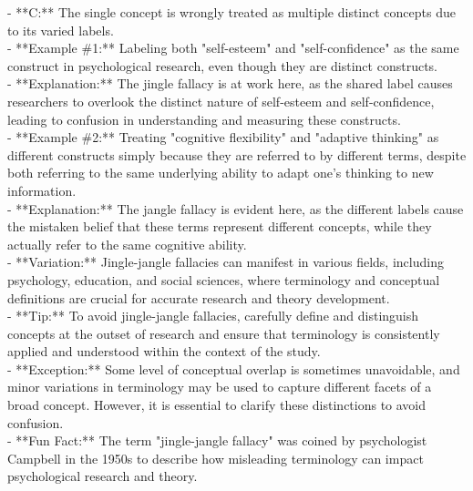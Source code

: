 \documentclass[a4paper,12pt,single,pdftex]{scrbook}
\begin{document}
    
          - **C:** The single concept is wrongly treated as multiple distinct concepts due to its varied labels.
    \\

    
      - **Example \#1:** Labeling both "self-esteem" and "self-confidence" as the same construct in psychological research, even though they are distinct constructs.
    \\

    
      - **Explanation:** The jingle fallacy is at work here, as the shared label causes researchers to overlook the distinct nature of self-esteem and self-confidence, leading to confusion in understanding and measuring these constructs.
    \\

    
      - **Example \#2:** Treating "cognitive flexibility" and "adaptive thinking" as different constructs simply because they are referred to by different terms, despite both referring to the same underlying ability to adapt one's thinking to new information.
    \\

    
      - **Explanation:** The jangle fallacy is evident here, as the different labels cause the mistaken belief that these terms represent different concepts, while they actually refer to the same cognitive ability.
    \\

    
      - **Variation:** Jingle-jangle fallacies can manifest in various fields, including psychology, education, and social sciences, where terminology and conceptual definitions are crucial for accurate research and theory development.
    \\

    
      - **Tip:** To avoid jingle-jangle fallacies, carefully define and distinguish concepts at the outset of research and ensure that terminology is consistently applied and understood within the context of the study.
    \\

    
      - **Exception:** Some level of conceptual overlap is sometimes unavoidable, and minor variations in terminology may be used to capture different facets of a broad concept. However, it is essential to clarify these distinctions to avoid confusion.
    \\

    
      - **Fun Fact:** The term "jingle-jangle fallacy" was coined by psychologist Campbell in the 1950s to describe how misleading terminology can impact psychological research and theory.
    \\
\end{document}
